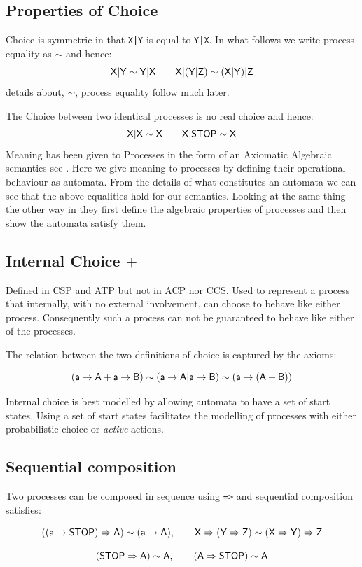 \documentclass[]{article}
\begin{document}
\subsection{Properties of Choice}
 Choice is symmetric in that \verb$X|Y$ is equal to \verb$Y|X$. In what follows we write process equality as $\sim$ and hence:
 \[\sf X|Y\sim Y|X\qquad X|(Y|Z)\sim (X|Y)|Z\]
 details about, $\sim$,  process equality follow much later. 

The Choice between two identical processes is no real choice and hence:
\[\sf X|X\sim X\qquad X|STOP \sim X\]
Meaning has been  given to Processes in the form of an Axiomatic Algebraic semantics see \cite{BaW90}. Here we give meaning to processes by defining their operational behaviour as automata. From the details of what constitutes an automata we can see that the above equalities hold for our semantics. Looking at the same thing the other way in \cite{BaW90} they first define the algebraic properties of processes and then show the automata satisfy them.

{
\subsection{Internal  Choice $+$}
Defined in CSP and ATP but not in ACP nor CCS.
Used to represent a process that internally, with no external involvement, can choose to behave like either process. Consequently such a process can not be guaranteed to behave like either of the processes.

The relation between the two definitions of choice is captured by the axioms:


\[\sf (a->A+a->B)\sim (a->A|a->B)\sim (a->(A+B))\]

Internal choice is best modelled by allowing automata to have a set of start states. Using a set of start states  facilitates the modelling of processes  with either  probabilistic choice or  \emph{active} actions.

}
\subsection{Sequential composition}

Two processes can be composed in sequence using \verb|=>|   and sequential composition satisfies:

\[\sf ((a->STOP)=>A) \sim (a->A),\qquad
X=>(Y=>Z) \sim (X=>Y)=>Z\]

\[\sf (STOP=>A) \sim A, \qquad (A=>STOP) \sim A \]
\end{document}
